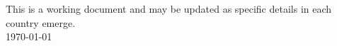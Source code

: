 \documentclass[twocolumn]{bmcart}%
\begin{document}
\begin{frontmatter}
\begin{fmbox}
\begin{artnotes}
\end{artnotes}

\end{fmbox}%


\begin{abstractbox}

This is a working document and may be updated as specific details in each country emerge. \\
\today

\end{abstractbox}
%

\end{frontmatter}



%
\end{document}
